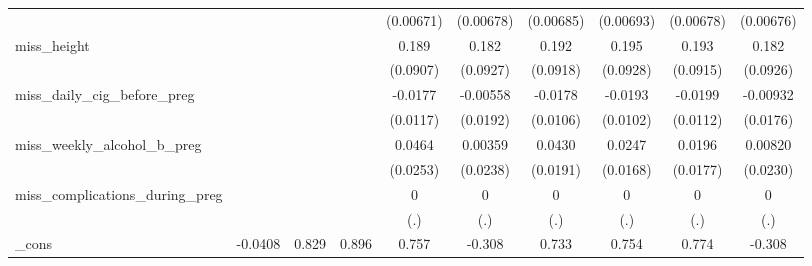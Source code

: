 \begin{table}[htbp]
\begin{tabular}{l*{9}{c}}
            &                     &                     &                     &   (0.00671)         &   (0.00678)         &   (0.00685)         &   (0.00693)         &   (0.00678)         &   (0.00676)         \\
[1em]
miss\_height &                     &                     &                     &       0.189\sym{**} &       0.182\sym{**} &       0.192\sym{**} &       0.195\sym{**} &       0.193\sym{**} &       0.182\sym{**} \\
            &                     &                     &                     &    (0.0907)         &    (0.0927)         &    (0.0918)         &    (0.0928)         &    (0.0915)         &    (0.0926)         \\
[1em]
miss\_daily\_cig\_before\_preg&                     &                     &                     &     -0.0177         &    -0.00558         &     -0.0178\sym{*}  &     -0.0193\sym{*}  &     -0.0199\sym{*}  &    -0.00932         \\
            &                     &                     &                     &    (0.0117)         &    (0.0192)         &    (0.0106)         &    (0.0102)         &    (0.0112)         &    (0.0176)         \\
[1em]
miss\_weekly\_alcohol\_b\_preg&                     &                     &                     &      0.0464\sym{*}  &     0.00359         &      0.0430\sym{**} &      0.0247         &      0.0196         &     0.00820         \\
            &                     &                     &                     &    (0.0253)         &    (0.0238)         &    (0.0191)         &    (0.0168)         &    (0.0177)         &    (0.0230)         \\
[1em]
miss\_complications\_during\_preg&                     &                     &                     &           0         &           0         &           0         &           0         &           0         &           0         \\
            &                     &                     &                     &         (.)         &         (.)         &         (.)         &         (.)         &         (.)         &         (.)         \\
[1em]
\_cons      &     -0.0408         &       0.829         &       0.896         &       0.757         &      -0.308         &       0.733         &       0.754         &       0.774         &      -0.308         \\

\end{tabular}
\end{table}
